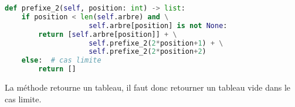 \documentclass[svgnames,11pt]{beamer}
\begin{document}
\begin{frame}[fragile]

\begin{center}
\begin{lstlisting}[language=Python , basicstyle=\ttfamily\small, xleftmargin=.5em, xrightmargin=-1em]
def prefixe_2(self, position: int) -> list:
    if position < len(self.arbre) and \
                    self.arbre[position] is not None:
        return [self.arbre[position]] + \
                    self.prefixe_2(2*position+1) + \
                    self.prefixe_2(2*position+2)
    else:  # cas limite
        return []
\end{lstlisting}
\end{center} 
\begin{aretenir}[Remarque]
La méthode retourne un tableau, il faut donc retourner un tableau vide dans le cas limite.
\end{aretenir}
    \end{frame}
\end{document}
